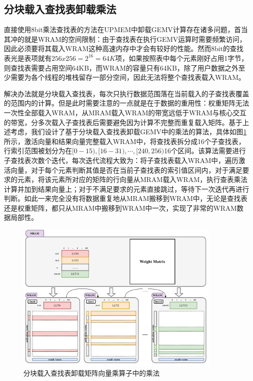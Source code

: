 \subsection{分块载入查找表卸载乘法}
直接使用8bit乘法查找表的方法在UPMEM中卸载GEMV计算存在诸多问题，首当其冲的就是WRAM的空间限制：由于查找表在执行GEMV运算时需要频繁访问，因此必须要将其载入WRAM这种高速内存中才会有较好的性能。然而8bit的查找表光是表项就有$256x256=2^{16}=64K$项，如果按照表中每个元素刚好占用1字节，则查找表需要占用空间64KB，而WRAM的容量只有64KB，除了用户数据之外至少需要为各个线程的堆栈留存一部分空间，因此无法将整个查找表载入WRAM。

解决办法就是分块载入查找表，每次只执行数据范围落在当前载入的子查找表覆盖的范围内的计算。但是此时需要注意的一点就是在于数据的重用性：权重矩阵无法一次性全部载入WRAM，从MRAM载入WRAM的带宽远低于WRAM与核心交互的带宽，分多次载入子查找表后需要避免因为计算不完整而重复载入矩阵。基于上述考虑，我们设计了基于分块载入查找表卸载GEMV中的乘法的算法，具体如图\ref{LUTBlock}所示，激活向量和结果向量完整载入WRAM中，将查找表拆分成16个子查找表，行索引范围被划分为在$[0-15),[16-31),\cdots,[240,256)$16个区间。该算法需要进行子查找表次数个迭代，每次迭代流程大致为：将子查找表载入WRAM中，遍历激活向量，对于每个元素判断其值是否在当前子查找表的索引值区间内，对于满足要求的元素，将该元素所对应的矩阵的行向量从MRAM载入WRAM，执行查表乘法计算并加到结果向量上；对于不满足要求的元素直接跳过，等待下一次迭代再进行判断。如此一来完全没有将数据重复地从MRAM搬移到WRAM中，无论是查找表还是权重矩阵，都只从MRAM中搬移到WRAM中一次，实现了非常的WRAM数据局部性。

\begin{figure}[!htbp]
	\centering
    \includegraphics[width=0.9\textwidth]{figures/LUTBlock.pdf}
	\caption{分块载入查找表卸载矩阵向量乘算子中的乘法}
    \label{LUTBlock}
\end{figure}

